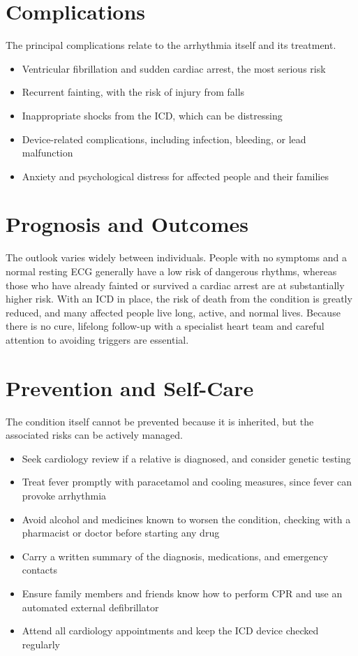 \section*{Complications}
The principal complications relate to the arrhythmia itself and its treatment.

\begin{itemize}
    \item Ventricular fibrillation and sudden cardiac arrest, the most serious risk
    \item Recurrent fainting, with the risk of injury from falls
    \item Inappropriate shocks from the ICD, which can be distressing
    \item Device-related complications, including infection, bleeding, or lead malfunction
    \item Anxiety and psychological distress for affected people and their families
\end{itemize}

\section*{Prognosis and Outcomes}
The outlook varies widely between individuals. People with no symptoms and a normal resting ECG generally have a low risk of dangerous rhythms, whereas those who have already fainted or survived a cardiac arrest are at substantially higher risk. With an ICD in place, the risk of death from the condition is greatly reduced, and many affected people live long, active, and normal lives. Because there is no cure, lifelong follow-up with a specialist heart team and careful attention to avoiding triggers are essential.

\section*{Prevention and Self-Care}
The condition itself cannot be prevented because it is inherited, but the associated risks can be actively managed.

\begin{itemize}
    \item Seek cardiology review if a relative is diagnosed, and consider genetic testing
    \item Treat fever promptly with paracetamol and cooling measures, since fever can provoke arrhythmia
    \item Avoid alcohol and medicines known to worsen the condition, checking with a pharmacist or doctor before starting any drug
    \item Carry a written summary of the diagnosis, medications, and emergency contacts
    \item Ensure family members and friends know how to perform CPR and use an automated external defibrillator
    \item Attend all cardiology appointments and keep the ICD device checked regularly
\end{itemize}

